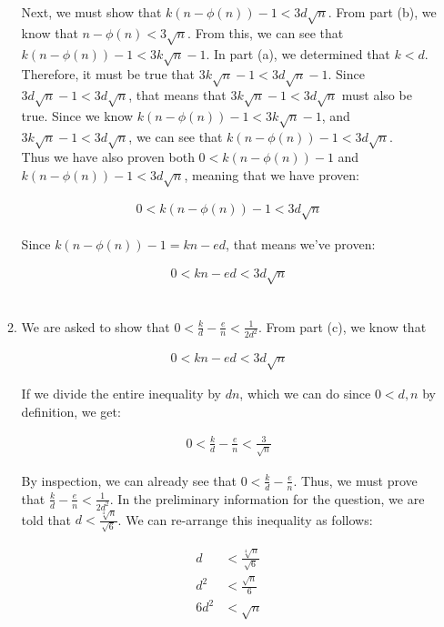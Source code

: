 \documentclass[11pt]{article}
\theoremstyle{definition}
\begin{document}
\begin{enumerate}
\begin{enumerate}
Next, we must show that $k(n - \phi(n)) - 1 < 3d\sqrt{n}$. From part (b), we know that $n - \phi(n) < 3\sqrt{n}$. From this, we can see that $k(n - \phi(n)) - 1 < 3k\sqrt{n} - 1$. In part (a), we determined that $k < d$. Therefore, it must be true that $3k\sqrt{n} - 1 < 3d\sqrt{n} - 1$. Since $3d\sqrt{n} - 1 < 3d\sqrt{n}$, that means that $3k\sqrt{n} - 1 < 3d\sqrt{n}$ must also be true. Since we know $k(n - \phi(n)) - 1 < 3k\sqrt{n} - 1$, and $3k\sqrt{n} - 1 < 3d\sqrt{n}$, we can see that $k(n - \phi(n)) - 1 < 3d\sqrt{n}$. \\

Thus we have also proven both $0 < k(n - \phi(n)) - 1$ and $k(n - \phi(n)) - 1 < 3d\sqrt{n}$, meaning that we have proven:

\begin{align*}
    0 < k(n - \phi(n)) - 1 < 3d\sqrt{n}
\end{align*}

Since $k(n - \phi(n)) - 1 = kn - ed$, that means we've proven:

\begin{align*}
    0 < kn - ed < 3d\sqrt{n}
\end{align*}
\\

\item %

We are asked to show that $0 < \frac{k}{d} - \frac{e}{n} < \frac{1}{2d^2}$. From part (c), we know that

\begin{align*}
    0 < kn - ed < 3d\sqrt{n}
\end{align*}

If we divide the entire inequality by $dn$, which we can do since $0 < d, n$ by definition, we get:

\begin{align*}
    0 < \frac{k}{d} - \frac{e}{n} < \frac{3}{\sqrt{n}}
\end{align*}

By inspection, we can already see that $0 < \frac{k}{d} - \frac{e}{n}$. Thus, we must prove that $\frac{k}{d} - \frac{e}{n} < \frac{1}{2d^2}$. In the preliminary information for the question, we are told that $d < \frac{\sqrt[4]{n}}{\sqrt{6}}$. We can re-arrange this inequality as follows:

\begin{align*}
    d &< \frac{\sqrt[4]{n}}{\sqrt{6}} \\
    d^2 &< \frac{\sqrt{n}}{6} \\
    6d^2 &< \sqrt{n}
\end{align*}


\end{enumerate}
\end{enumerate}
\end{document}
